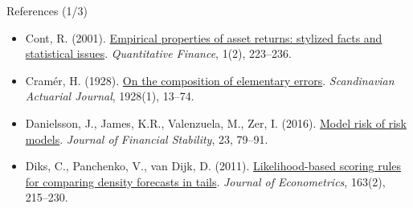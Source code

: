\begin{frame}{References (1/3)}
\begin{itemize}
    \item Cont, R. (2001). \href{https://doi.org/10.1080/713665670}{Empirical properties of asset returns: stylized facts and statistical issues}. \textit{Quantitative Finance}, 1(2), 223--236.
    \item Cramér, H. (1928). \href{https://doi.org/10.1080/03461238.1928.10416862}{On the composition of elementary errors}. \textit{Scandinavian Actuarial Journal}, 1928(1), 13--74.
    \item Danielsson, J., James, K.R., Valenzuela, M., Zer, I. (2016). \href{https://doi.org/10.1016/j.jfs.2016.02.002}{Model risk of risk models}. \textit{Journal of Financial Stability}, 23, 79--91.
    \item Diks, C., Panchenko, V., van Dijk, D. (2011). \href{https://doi.org/10.1016/j.jeconom.2011.04.001}{Likelihood-based scoring rules for comparing density forecasts in tails}. \textit{Journal of Econometrics}, 163(2), 215--230.
\end{itemize}
\end{frame}

